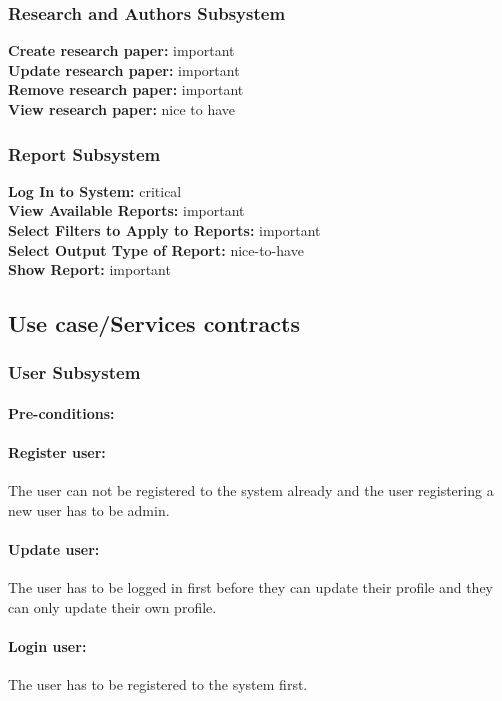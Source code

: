 \documentclass{article}
\begin{document}
			\subsubsection{Research and Authors Subsystem}
				\textbf{Create research paper:} important\\
				\textbf{Update research paper:} important\\
				\textbf{Remove research paper:} important\\
				\textbf{View research paper:} nice to have\\
			\subsubsection{Report Subsystem}
				\textbf{Log In to System:} critical\\
				\textbf{View Available Reports:} important\\
				\textbf{Select Filters to Apply to Reports:} important\\
				\textbf{Select Output Type of Report:} nice-to-have\\
				\textbf{Show Report:} important\\
		\subsection{Use case/Services contracts}
			\subsubsection{User Subsystem}
				\paragraph{Pre-conditions:}
				\paragraph{Register user:} The user can not be registered to the system already and the user registering a new user has to be admin.
				\paragraph{Update user:} The user has to be logged in first before they can update their profile and they can only update their own profile.
				\paragraph{Login user:} The user has to be registered to the system first.
\end{document}
